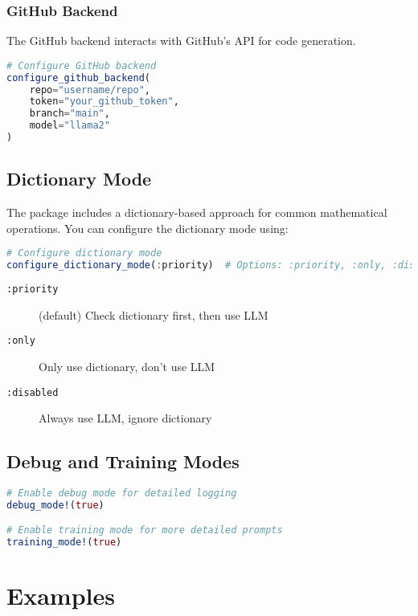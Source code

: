 \documentclass[11pt,a4paper]{article}
\newcommand{\code}[1]{\texttt{#1}}
\providecommand{\code}[1]{\texttt{\color{blue!70!black}#1}}
\begin{document}
\subsubsection{GitHub Backend}
The GitHub backend interacts with GitHub's API for code generation.

\begin{lstlisting}[language=Julia]
# Configure GitHub backend
configure_github_backend(
    repo="username/repo",
    token="your_github_token",
    branch="main",
    model="llama2"
)
\end{lstlisting}

\subsection{Dictionary Mode}
\label{subsec:dictionary_mode}

The package includes a dictionary-based approach for common mathematical operations. You can configure the dictionary mode using:

\begin{lstlisting}[language=Julia]
# Configure dictionary mode
configure_dictionary_mode(:priority)  # Options: :priority, :only, :disabled
\end{lstlisting}

\begin{description}
    \item[\code{:priority}] (default) Check dictionary first, then use LLM
    \item[\code{:only}] Only use dictionary, don't use LLM
    \item[\code{:disabled}] Always use LLM, ignore dictionary
\end{description}

\subsection{Debug and Training Modes}

\begin{lstlisting}[language=Julia]
# Enable debug mode for detailed logging
debug_mode!(true)

# Enable training mode for more detailed prompts
training_mode!(true)
\end{lstlisting}

\section{Examples}
\label{sec:examples}
\end{document}
